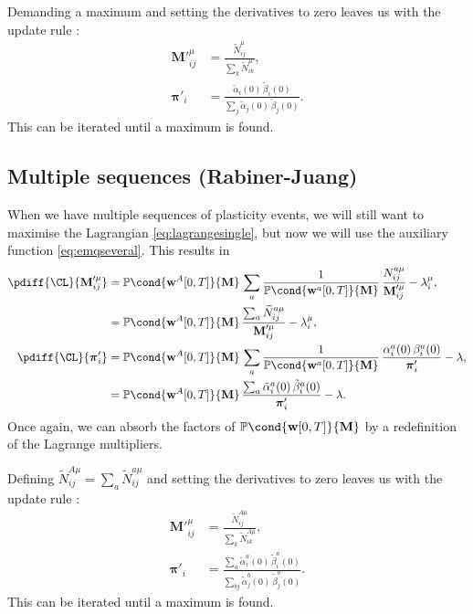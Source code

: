 \documentclass[12pt]{article}
\newcommand{\pib}{\boldsymbol{\pi}}
\newcommand{\w}{\mathbf{w}}
\newcommand{\M}{\mathbf{M}}
\newcommand{\pr}{\mathbb{P}}
\begin{document}
Demanding a maximum and setting the derivatives to zero leaves us with the update rule \cite{Baum1970baumwelch}:
%
\begin{equation}\label{eq:BWupdate}
\begin{aligned}
  \M'^\mu_{ij} &= \frac{ \widetilde{N}^\mu_{ij} }{ \sum_k \widetilde{N}^\mu_{ik} },\\
  \pib'_{i} &= \frac{ \tilde{\alpha}_i(0) \, \tilde{\beta}_i(0) }{ \sum_j \tilde{\alpha}_j(0) \, \tilde{\beta}_j(0) }.
\end{aligned}
\end{equation}
%
This can be iterated until a maximum is found.


\subsection{Multiple sequences (Rabiner-Juang) \label{sec:rj}}

When we have multiple sequences of plasticity events, we will still want to maximise the Lagrangian \eqref{eq:lagrangesingle}, but now we will use the auxiliary function \eqref{eq:emqseveral}.
This results in
%
\begin{equation}\label{eq:multidiffs}
\begin{aligned}
  \pdiff{\CL}{\M'^\mu_{ij}} &= \pr\cond{\w^A[0,T]}{\M} \,\sum_a \frac{1}{\pr\cond{\w^a[0,T]}{\M}} \,
    \frac{ N^{a\mu}_{ij} }{ \M'^\mu_{ij} } - \lambda^\mu_{i}, \\
    &= \pr\cond{\w^A[0,T]}{\M} \, \frac{ \sum_a \widetilde{N}^{a\mu}_{ij} }{ \M'^\mu_{ij} } - \lambda^\mu_{i}, \\
  \pdiff{\CL}{\pib'_{i}} &= \pr\cond{\w^A[0,T]}{\M} \,\sum_a \frac{1}{\pr\cond{\w^a[0,T]}{\M}} \,
    \frac{ \alpha^a_i(0) \, \beta^a_i(0) }{ \pib'_{i} } - \lambda,\\
    &= \pr\cond{\w^A[0,T]}{\M} \,
    \frac{ \sum_a \tilde{\alpha}^a_i(0) \, \tilde{\beta}^a_i(0) }{ \pib'_{i} } - \lambda.
\end{aligned}
\end{equation}
%
Once again, we can absorb the factors of $\pr\cond{\w[0,T]}{\M}$ by a redefinition of the Lagrange multipliers.

Defining $\widetilde{N}^{A\mu}_{ij} = \sum_a \widetilde{N}^{a\mu}_{ij}$ and setting the derivatives to zero leaves us with the update rule \cite{rabiner1993speechrec}:
%
\begin{equation}\label{eq:RJupdate}
\begin{aligned}
  \M'^\mu_{ij} &= \frac{ \widetilde{N}^{A\mu}_{ij} }{ \sum_k \widetilde{N}^{A\mu}_{ik} },\\
  \pib'_{i} &= \frac{ \sum_a \tilde{\alpha}^a_i(0) \, \tilde{\beta}^a_i(0) }{ \sum_{bj} \tilde{\alpha}^b_j(0) \, \tilde{\beta}^b_j(0) }.
\end{aligned}
\end{equation}
%
This can be iterated until a maximum is found.
\end{document}
